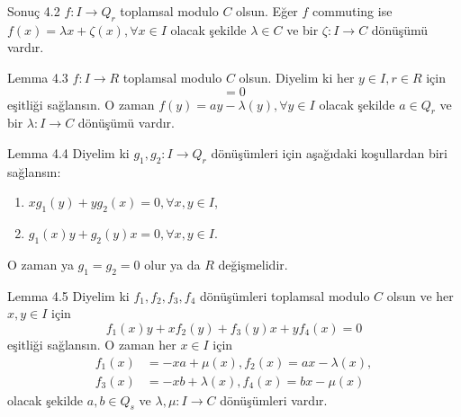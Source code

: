 \documentclass{beamer}
\begin{document}
\begin{frame}

\begin{block}{Sonuç 4.2}
$f \colon I \to Q_r$ toplamsal modulo $C$ olsun. Eğer $f$ commuting ise $f(x) = \lambda x + \zeta(x), \forall x \in I$ olacak şekilde $\lambda \in C$ ve bir $\zeta \colon I \to C$ dönüşümü vardır.
\end{block}
    
\end{frame}

\begin{frame}

\begin{block}{Lemma 4.3}
$f \colon I \to R$ toplamsal modulo $C$ olsun. Diyelim ki her $y \in I, r \in R$ için
\begin{equation*}
    [r,f(yr)-f(y)r] = 0
\end{equation*}
eşitliği sağlansın. O zaman $f(y) = ay - \lambda(y), \forall y \in I$ olacak şekilde $a \in Q_r$ ve bir $\lambda \colon I \to C$ dönüşümü vardır.
\end{block}
    
\end{frame}

\begin{frame}

\begin{block}{Lemma 4.4}
Diyelim ki $g_1, g_2 \colon I \to Q_r$ dönüşümleri için aşağıdaki koşullardan biri sağlansın:
\begin{enumerate}
    \item $xg_1(y) + yg_2(x) = 0, \forall x, y \in I$,
    \item $g_1(x)y + g_2(y)x = 0, \forall x, y \in I$.
\end{enumerate}
O zaman ya $g_1 = g_2 = 0$ olur ya da $R$ değişmelidir.
\end{block}
    
\end{frame}

\begin{frame}

\begin{block}{Lemma 4.5}
Diyelim ki $f_1, f_2, f_3, f_4$ dönüşümleri toplamsal modulo $C$ olsun ve her $x, y \in I$ için
\begin{equation*}
    f_1(x)y + xf_2(y) + f_3(y)x + yf_4(x) = 0
\end{equation*}
eşitliği sağlansın. O zaman her $x \in I$ için
\begin{align*}
    f_1(x) &= -xa + \mu(x), f_2(x) = ax - \lambda(x),\\
    f_3(x) &= -xb + \lambda(x), f_4(x) = bx - \mu(x)
\end{align*}
olacak şekilde $a, b \in Q_s$ ve $\lambda, \mu \colon I \to C$ dönüşümleri vardır.
\end{block}
    
\end{frame}
\end{document}
